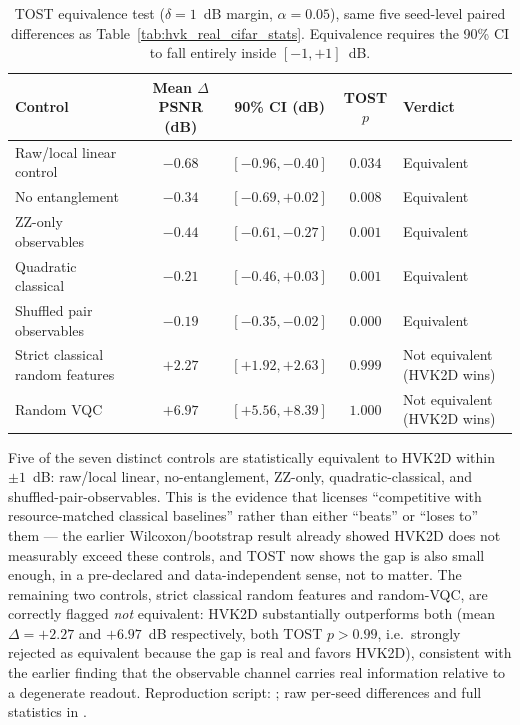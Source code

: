 \documentclass[11pt]{article}
\begin{document}
\begin{table}[H]
\centering
\caption{TOST equivalence test ($\delta=1$~dB margin, $\alpha=0.05$), same five seed-level paired differences as Table~\ref{tab:hvk_real_cifar_stats}. Equivalence requires the 90\% CI to fall entirely inside $[-1,+1]$~dB.}
\label{tab:tost_equivalence}
\scriptsize
\begin{tabular}{lcccl}
\toprule
Control & Mean $\Delta$PSNR (dB) & 90\% CI (dB) & TOST $p$ & Verdict \\
\midrule
Raw/local linear control & $-0.68$ & $[-0.96,-0.40]$ & $0.034$ & Equivalent \\
No entanglement & $-0.34$ & $[-0.69,+0.02]$ & $0.008$ & Equivalent \\
ZZ-only observables & $-0.44$ & $[-0.61,-0.27]$ & $0.001$ & Equivalent \\
Quadratic classical & $-0.21$ & $[-0.46,+0.03]$ & $0.001$ & Equivalent \\
Shuffled pair observables & $-0.19$ & $[-0.35,-0.02]$ & $0.000$ & Equivalent \\
Strict classical random features & $+2.27$ & $[+1.92,+2.63]$ & $0.999$ & Not equivalent (HVK2D wins) \\
Random VQC & $+6.97$ & $[+5.56,+8.39]$ & $1.000$ & Not equivalent (HVK2D wins) \\
\bottomrule
\end{tabular}
\end{table}

Five of the seven distinct controls are statistically equivalent to HVK2D within $\pm1$~dB: raw/local linear, no-entanglement, ZZ-only, quadratic-classical, and shuffled-pair-observables. This is the evidence that licenses ``competitive with resource-matched classical baselines'' rather than either ``beats'' or ``loses to'' them --- the earlier Wilcoxon/bootstrap result already showed HVK2D does not measurably exceed these controls, and TOST now shows the gap is also small enough, in a pre-declared and data-independent sense, not to matter. The remaining two controls, strict classical random features and random-VQC, are correctly flagged \emph{not} equivalent: HVK2D substantially outperforms both (mean $\Delta=+2.27$ and $+6.97$~dB respectively, both TOST $p>0.99$, i.e.\ strongly rejected as equivalent because the gap is real and favors HVK2D), consistent with the earlier finding that the observable channel carries real information relative to a degenerate readout. Reproduction script: ; raw per-seed differences and full statistics in .
\end{document}
